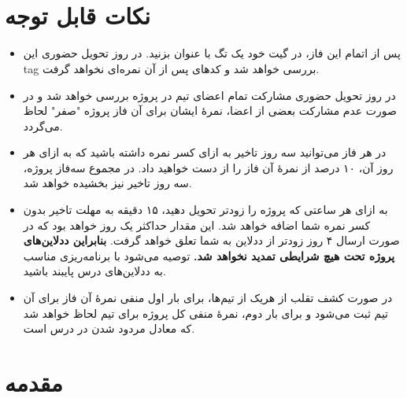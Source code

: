 \documentclass[]{article}
\begin{document}
\newpage
\pagestyle{fancy}
\fancyhf{}
\fancyfoot{}
\cfoot{\thepage}
\renewcommand{\headrulewidth}{2pt}

\KashidaOff


 \Large \textbf{\\\\
}

\section*{{\titr نکات قابل توجه}}

\begin{itemize}
\item
پس از اتمام این فاز، در گیت خود یک تگ با عنوان  بزنید. در روز تحویل حضوری این tag بررسی خواهد شد و کدهای پس از آن نمره‌ای نخواهد گرفت.

\item
در روز تحویل حضوری مشارکت تمام اعضای تیم در پروژه بررسی خواهد‌ شد و در صورت عدم مشارکت بعضی از اعضا، نمرهٔ ایشان برای آن فاز پروژه "صفر" لحاظ می‌گردد.

\item
در هر فاز می‌توانید سه روز تاخیر به ازای کسر نمره داشته‌ باشید که به ازای هر روز آن، ۱۰ درصد از نمرهٔ آن فاز را از دست خواهید‌ داد. در مجموع سه‌فاز پروژه، سه روز تاخیر نیز بخشیده خواهد‌ شد.

\item
به ازای هر ساعتی که پروژه را زودتر تحویل دهید، ۱۵ دقیقه به مهلت تاخیر بدون کسر نمره شما اضافه خواهد‌ شد. این مقدار حداکثر یک روز خواهد‌ بود که در صورت ارسال ۴ روز زودتر از ددلاین به شما تعلق خواهد گرفت. \textbf{بنابراین ددلاین‌های پروژه تحت هیچ شرایطی تمدید نخواهد‌ شد.} توصیه می‌شود با برنامه‌ریزی مناسب به ددلاین‌های درس پایبند باشید.

\item
در صورت کشف تقلب از هریک از تیم‌ها، برای بار اول منفی نمرهٔ آن فاز برای آن تیم ثبت می‌شود و برای بار دوم، نمرهٔ منفی کل پروژه برای تیم لحاظ خواهد‌ شد که معادل مردود شدن در درس است.
\end{itemize}

\newpage

\section*{{\titr مقدمه}}
\end{document}
